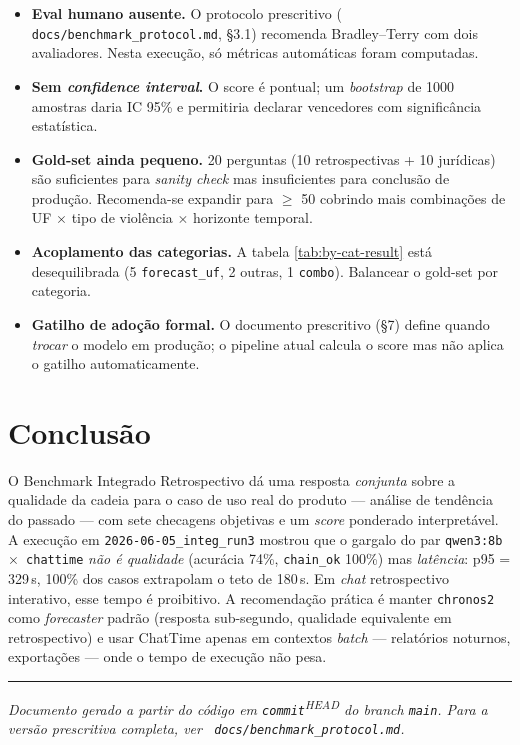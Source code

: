 \documentclass[11pt,a4paper]{article}
\newcommand{\code}[1]{\texttt{\small #1}}
\newcommand{\file}[1]{\texttt{\small\color{black!75} #1}}
\begin{document}
\begin{itemize}[leftmargin=*]
\item \textbf{Eval humano ausente.} O protocolo prescritivo
(\file{docs/benchmark\_protocol.md}, §3.1) recomenda Bradley--Terry com
dois avaliadores. Nesta execução, só métricas automáticas foram
computadas.

\item \textbf{Sem \emph{confidence interval}.} O score é pontual; um
\emph{bootstrap} de 1000 amostras daria IC 95\% e permitiria declarar
vencedores com significância estatística.

\item \textbf{Gold-set ainda pequeno.} 20 perguntas (10 retrospectivas + 10 jurídicas) são suficientes para
\emph{sanity check} mas insuficientes para conclusão de produção.
Recomenda-se expandir para $\ge$ 50 cobrindo mais combinações de UF $\times$
tipo de violência $\times$ horizonte temporal.

\item \textbf{Acoplamento das categorias.} A tabela
\ref{tab:by-cat-result} está desequilibrada (5 \code{forecast\_uf},
2 outras, 1 \code{combo}). Balancear o gold-set por categoria.

\item \textbf{Gatilho de adoção formal.} O documento prescritivo (§7)
define quando \emph{trocar} o modelo em produção; o pipeline atual
calcula o score mas não aplica o gatilho automaticamente.
\end{itemize}

\section{Conclusão}

O Benchmark Integrado Retrospectivo dá uma resposta \emph{conjunta}
sobre a qualidade da cadeia para o caso de uso real do produto ---
análise de tendência do passado --- com sete checagens objetivas e um
\emph{score} ponderado interpretável. A execução em
\code{2026-06-05\_integ\_run3} mostrou que o gargalo do par
\code{qwen3:8b $\times$ chattime} \emph{não é qualidade} (acurácia 74\%,
\code{chain\_ok} 100\%) mas \emph{latência}: p95 = 329\,s, 100\% dos
casos extrapolam o teto de 180\,s. Em \emph{chat} retrospectivo
interativo, esse tempo é proibitivo. A recomendação prática é manter
\code{chronos2} como \emph{forecaster} padrão (resposta sub-segundo,
qualidade equivalente em retrospectivo) e usar ChatTime apenas em
contextos \emph{batch} --- relatórios noturnos, exportações --- onde o
tempo de execução não pesa.

\bigskip\hrule\smallskip
\noindent\textit{Documento gerado a partir do código em
\code{commit}\textsuperscript{HEAD} do branch \code{main}.
Para a versão prescritiva completa, ver
\file{docs/benchmark\_protocol.md}.}
\end{document}
